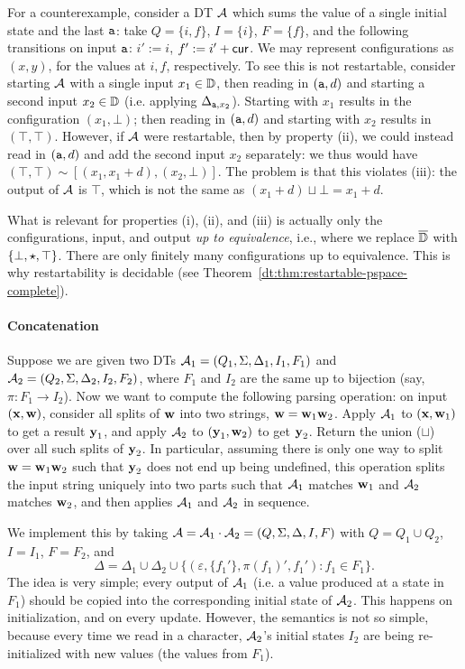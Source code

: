 For a counterexample, consider a DT $\mathcal{A}$ which sums the value of a single initial state and the last ${\texttt{a}}$: take $Q = \{i, f\}$, $I = \{i\}$, $F = \{f\}$, and the following transitions on input ${\texttt{a}}$: $i' := i$, $f' := i' + \mathsf{cur}$. We may represent configurations as $(x,y)$, for the values at $i, f$, respectively. To see this is not restartable, consider starting $\mathcal{A}$ with a single input $x_1 \in \mathbb{D}$, then reading in $({\texttt{a}},d)$ and starting a second input $x_2 \in \mathbb{D}$ (i.e. applying $\Delta_{{\texttt{a}},x_2}$). Starting with $x_1$ results in the configuration $(x_1,\bot)$; then reading in $({\texttt{a}},d)$ and starting with $x_2$ results in $(\top, \top)$. However, if $\mathcal{A}$ were restartable, then by property (ii), we could instead read in $({\texttt{a}},d)$ and add the second input $x_2$ separately: we thus would have $(\top,\top) \sim [(x_1,x_1+d),(x_2,\bot)]$. The problem is that this violates (iii): the output of $\mathcal{A}$ is $\top$, which is not the same as $(x_1 + d) \sqcup \bot = x_1 + d$.

What is relevant for properties (i), (ii), and (iii) is actually only the configurations, input, and output \emph{up to equivalence}, i.e., where we replace $\overline{\mathbb{D}{}}$ with $\{\bot, \star, \top\}$.
There are only finitely many configurations up to equivalence. This is why restartability is decidable (see Theorem~\ref{dt:thm:restartable-pspace-complete}).

\paragraph*{Concatenation}
Suppose we are given two DTs $\mathcal{A}_1 = (Q_{1}, \Sigma, \Delta_{1}, I_{1}, F_{1})$ and $\mathcal{A}_2 = (Q_{2}, \Sigma, \Delta_{2}, I_{2}, F_{2})$, where $F_1$ and $I_2$ are the same up to bijection (say, $\pi: F_1 \to I_2$).
Now we want to compute the following parsing operation: on input $(\textbf{x},\textbf{w})$, consider all splits of $\textbf{w}$ into two strings, $\textbf{w} = \textbf{w}_1 \textbf{w}_2$. Apply $\mathcal{A}_1$ to $(\textbf{x},\textbf{w}_1)$ to get a result $\textbf{y}_1$, and apply $\mathcal{A}_2$ to $(\textbf{y}_1,\textbf{w}_2)$ to get $\textbf{y}_2$. Return the union ($\sqcup$) over all such splits of $\textbf{y}_2$. In particular, assuming there is only one way to split $\textbf{w} = \textbf{w}_1 \textbf{w}_2$ such that $\textbf{y}_2$ does not end up being undefined, this operation splits the input string uniquely into two parts such that $\mathcal{A}_1$ matches $\textbf{w}_1$ and $\mathcal{A}_2$ matches $\textbf{w}_2$, and then applies $\mathcal{A}_1$ and $\mathcal{A}_2$ in sequence.

We implement this by taking $\mathcal{A} = \mathcal{A}_1 \cdot \mathcal{A}_2 = (Q, \Sigma, \Delta, I, F){}$ with $Q = Q_1 \cup Q_2$, $I = I_1$, $F = F_2$, and
\[
\Delta = \Delta_1 \cup \Delta_2 \cup \big\{(\varepsilon, \{f_1'\}, \pi(f_1)', f_1'): f_1 \in F_1 \big\}.
\]
The idea is very simple; every output of $\mathcal{A}_1$ (i.e. a value produced at a state in $F_1$) should be copied into the corresponding initial state of $\mathcal{A}_2$. This happens on initialization, and on every update. However, the semantics is not so simple, because every time we read in a character, $\mathcal{A}_2$'s initial states $I_2$ are being re-initialized with new values (the values from $F_1$).

